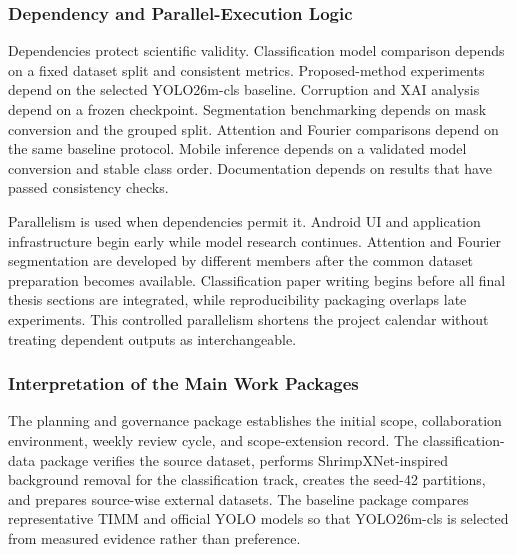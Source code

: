 \subsubsection{Dependency and Parallel-Execution Logic}
Dependencies protect scientific validity. Classification model comparison depends on a fixed dataset split and consistent metrics. Proposed-method experiments depend on the selected YOLO26m-cls baseline. Corruption and XAI analysis depend on a frozen checkpoint. Segmentation benchmarking depends on mask conversion and the grouped split. Attention and Fourier comparisons depend on the same baseline protocol. Mobile inference depends on a validated model conversion and stable class order. Documentation depends on results that have passed consistency checks.\par
Parallelism is used when dependencies permit it. Android UI and application infrastructure begin early while model research continues. Attention and Fourier segmentation are developed by different members after the common dataset preparation becomes available. Classification paper writing begins before all final thesis sections are integrated, while reproducibility packaging overlaps late experiments. This controlled parallelism shortens the project calendar without treating dependent outputs as interchangeable.\par
\subsubsection{Interpretation of the Main Work Packages}
The planning and governance package establishes the initial scope, collaboration environment, weekly review cycle, and scope-extension record. The classification-data package verifies the source dataset, performs ShrimpXNet-inspired background removal for the classification track, creates the seed-42 partitions, and prepares source-wise external datasets. The baseline package compares representative TIMM and official YOLO models so that YOLO26m-cls is selected from measured evidence rather than preference.\par
{}
